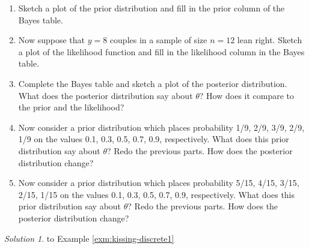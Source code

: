 \documentclass[
]{book}
\providecommand{\tightlist}{%
  \setlength{\itemsep}{0pt}\setlength{\parskip}{0pt}}
\theoremstyle{definition}
\theoremstyle{definition}
\theoremstyle{definition}
\theoremstyle{remark}
\newtheorem*{solution}{Solution}
\begin{document}
\begin{enumerate}
\def\labelenumi{\arabic{enumi}.}
\tightlist
\item
  Sketch a plot of the prior distribution and fill in the prior column of the Bayes table.
\item
  Now suppose that \(y=8\) couples in a sample of size \(n=12\) lean right. Sketch a plot of the likelihood function and fill in the likelihood column in the Bayes table.
\item
  Complete the Bayes table and sketch a plot of the posterior distribution. What does the posterior distribution say about \(\theta\)? How does it compare to the prior and the likelihood?
\item
  Now consider a prior distribution which places probability 1/9, 2/9, 3/9, 2/9, 1/9 on the values 0.1, 0.3, 0.5, 0.7, 0.9, respectively. What does this prior distribution say about \(\theta\)? Redo the previous parts. How does the posterior distribution change?
\item
  Now consider a prior distribution which places probability 5/15, 4/15, 3/15, 2/15, 1/15 on the values 0.1, 0.3, 0.5, 0.7, 0.9, respectively. What does this prior distribution say about \(\theta\)? Redo the previous parts. How does the posterior distribution change?
\end{enumerate}

\begin{solution}
{}to Example \ref{exm:kissing-discrete1}
\end{solution}
\end{document}
